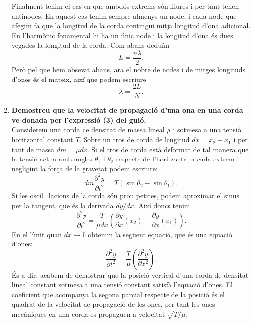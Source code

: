 \documentclass[12pt, a4paper]{article}
\begin{document}
\begin{enumerate}
Finalment tenim el cas en que ambdós extrems són lliures i per tant tenen antinodes. En aquest cas tenim sempre almenys un node, i cada node que afegim fa que la longitud de la corda contingui mitja longitud d'ona adicional. En l'harmònic fonamental hi ha un únic node i la longitud d'ona és dues vegades la longitud de la corda. Com abans deduïm
\begin{equation*}
  L = \dfrac{n\lambda}{2}.
\end{equation*}
Però pel que hem obsevat abans, ara el nobre de nodes i de mitges longituds d'ones és el mateix, així que podem escriure
\begin{equation*}
  \lambda = \dfrac{2L}{N}.
\end{equation*}

\item \textbf{Demostreu que la velocitat de propagació d'una ona en una corda ve donada per l'expressió (3) del guió.} \\
\indent Considerem una corda de densitat de massa lineal \( \mu \) i sotmesa a una tensió horitzontal constant \( T \). Sobre un tros de corda de longitud \( dx = x_2 - x_1 \) i per tant de massa \( dm = \mu dx \). Si el tros de corda està deformat de tal manera que la tensió actua amb angles \( \theta_1 \) i \( \theta_2 \) respecte de l'horitzontal a cada extrem i negligint la força de la gravetat podem escriure:
\begin{equation*}
dm\dfrac{\partial^2 y}{\partial t^2} = T(\sin{\theta_2} - \sin{\theta_1}). 
\end{equation*}
Si les oscil·lacions de la corda són prou petites, podem aproximar el sinus per la tangent, que és la derivada \( dy/dx \). Així doncs tenim
\begin{equation*}
 \dfrac{\partial^2 y}{\partial t^2}  = \dfrac{T}{\mu dx} \left( \dfrac{\partial y}{\partial x}(x_2) - \dfrac{\partial y}{\partial x}(x_1) \right).
\end{equation*}
En el límit quan \( dx \to 0 \) obtenim la següent equació, que és una equació d'ones:
\begin{equation}
  \dfrac{\partial^2 y}{\partial t^2} = \dfrac{T}{\mu} \left( \dfrac{\partial^2 y}{\partial x^2} \right).
\end{equation}
És a dir, acabem de demostrar que la posició vertical d'una corda de densitat lineal constant sotmesa a una tensió constant satisfà l'equació d'ones. El coeficient que acompanya la segona parcial respecte de la posició és el quadrat de la velocitat de propagació de les ones, per tant les ones mecàniques en una corda es propaguen a velocitat \( \sqrt{T/\mu} \). 


\end{enumerate}
\end{document}
